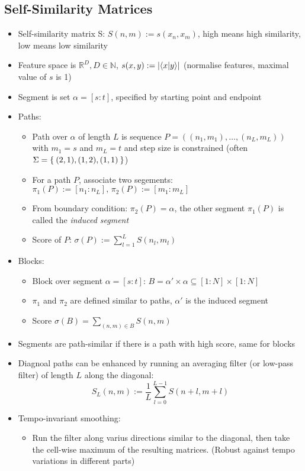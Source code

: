 \subsection{Self-Similarity Matrices}
\begin{itemize}
	\item
		Self-similarity matrix S: $S(n,m) := s(x_n, x_m)$, high means high similarity, low means low similarity
	\item
		Feature space is $\mathbb{R}^D, D \in \mathbb{N}$, $s(x,y) := \lvert\langle x|y\rangle\rvert$ (normalise features, maximal value of $s$ is 1)
	\item
		Segment is set $\alpha = [s : t]$, specified by starting point and endpoint
	\item Paths:
		\begin{itemize}
			\item
				Path over $\alpha$ of length $L$ is sequence $P = ((n_1,m_1), \dots , (n_L, m_L))$ with $m_1 = s$ and $m_L = t$ and step size is constrained (often $\Sigma = \Set{(2,1), (1,2), (1,1)}$)
			\item
				For a path $P$, associate two segements: $\pi_1(P) := [n_1 : n_L],\, \pi_2(P) := [m_1 : m_L]$
			\item
				From boundary condition: $\pi_2(P) = \alpha$, the other segment $\pi_1(P)$ is called the \textit{induced segment}
			\item
				Score of $P$: $\sigma(P) := \sum_{l=1}^L S(n_l, m_l)$
		\end{itemize}
	\item
		Blocks:
		\begin{itemize}
			\item
				Block over segment $\alpha = [s:t]$: $B = \alpha' \times \alpha \subseteq [1:N] \times [1:N]$
			\item
				$\pi_1$ and $\pi_2$ are defined similar to paths, $\alpha'$ is the induced segment
			\item
				Score $\sigma(B) = \sum_{(n,m) \in B} S(n,m)$
		\end{itemize}
	\item
		Segments are path-similar if there is a path with high score, same for blocks
	\item
		Diagnoal paths can be enhanced by running an averaging filter (or low-pass filter) of length $L$ along the diagonal:
		$$S_L(n,m) := \frac1L \sum_{l = 0}^{L-1} S(n+l,m+l)$$
	\item
		Tempo-invariant smoothing:
		\begin{itemize}
			\item Run the filter along varius directions similar to the diagonal, then take the cell-wise maximum of the resulting matrices. (Robust against tempo variations in different parts)

\end{itemize}
\end{itemize}
